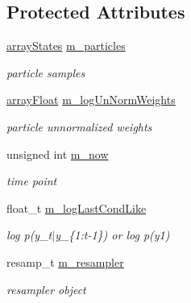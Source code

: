 \subsection*{Protected Attributes}
\begin{DoxyCompactItemize}
\item 
\mbox{\label{classBSFilter_a52dde1eb7fe247f783f4f2e5388f86ac}} 
\hyperlink{classBSFilter_a1d6f4a7ba66dda970cd6ea68a70fd641}{array\+States} \hyperlink{classBSFilter_a52dde1eb7fe247f783f4f2e5388f86ac}{m\+\_\+particles}
\begin{DoxyCompactList}\small\item\em particle samples \end{DoxyCompactList}\item 
\mbox{\label{classBSFilter_a06b115e9578557bbef4064e43b1afbbe}} 
\hyperlink{classBSFilter_af495dadc972ef1f8d776fe1716177aee}{array\+Float} \hyperlink{classBSFilter_a06b115e9578557bbef4064e43b1afbbe}{m\+\_\+log\+Un\+Norm\+Weights}
\begin{DoxyCompactList}\small\item\em particle unnormalized weights \end{DoxyCompactList}\item 
\mbox{\label{classBSFilter_adf89ebde89f4ab2d5aa7754042481345}} 
unsigned int \hyperlink{classBSFilter_adf89ebde89f4ab2d5aa7754042481345}{m\+\_\+now}
\begin{DoxyCompactList}\small\item\em time point \end{DoxyCompactList}\item 
\mbox{\label{classBSFilter_a4aca072edced8670e55023a47ffd551a}} 
float\+\_\+t \hyperlink{classBSFilter_a4aca072edced8670e55023a47ffd551a}{m\+\_\+log\+Last\+Cond\+Like}
\begin{DoxyCompactList}\small\item\em log p(y\+\_\+t$\vert$y\+\_\+\{1\+:t-\/1\}) or log p(y1) \end{DoxyCompactList}\item 
\mbox{\label{classBSFilter_aff77ccb7698f098b7d88781a20cef538}} 
resamp\+\_\+t \hyperlink{classBSFilter_aff77ccb7698f098b7d88781a20cef538}{m\+\_\+resampler}
\begin{DoxyCompactList}\small\item\em resampler object \end{DoxyCompactList}\item 

\end{DoxyCompactItemize}
